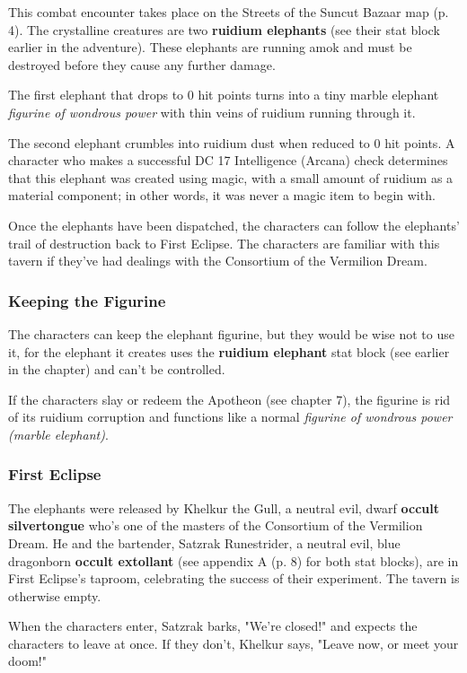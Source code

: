 \documentclass[letterpaper, 11pt, bg=full, twocolumn]{dndbook}
\begin{document}
This combat encounter takes place on the Streets of the Suncut Bazaar map (p. 4). The crystalline creatures are two \textbf{ruidium elephants} (see their stat block earlier in the adventure). These elephants are running amok and must be destroyed before they cause any further damage.

The first elephant that drops to 0 hit points turns into a tiny marble elephant \textit{figurine of wondrous power} with thin veins of ruidium running through it.

The second elephant crumbles into ruidium dust when reduced to 0 hit points. A character who makes a successful DC 17 Intelligence (Arcana) check determines that this elephant was created using magic, with a small amount of ruidium as a material component; in other words, it was never a magic item to begin with.

Once the elephants have been dispatched, the characters can follow the elephants' trail of destruction back to First Eclipse. The characters are familiar with this tavern if they've had dealings with the Consortium of the Vermilion Dream.

\subsubsection{Keeping the Figurine}

The characters can keep the elephant figurine, but they would be wise not to use it, for the elephant it creates uses the \textbf{ruidium elephant} stat block (see earlier in the chapter) and can't be controlled.

If the characters slay or redeem the Apotheon (see chapter 7), the figurine is rid of its ruidium corruption and functions like a normal \textit{figurine of wondrous power (marble elephant)}.

\subsubsection{First Eclipse}

The elephants were released by Khelkur the Gull, a neutral evil, dwarf \textbf{occult silvertongue} who's one of the masters of the Consortium of the Vermilion Dream. He and the bartender, Satzrak Runestrider, a neutral evil, blue dragonborn \textbf{occult extollant} (see appendix A (p. 8) for both stat blocks), are in First Eclipse's taproom, celebrating the success of their experiment. The tavern is otherwise empty.

When the characters enter, Satzrak barks, "We're closed!" and expects the characters to leave at once. If they don't, Khelkur says, "Leave now, or meet your doom!"
\end{document}
